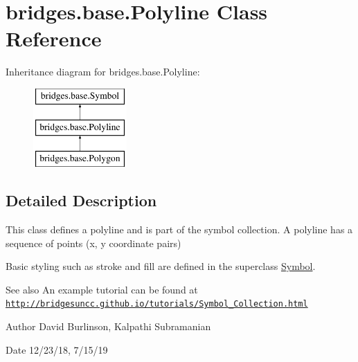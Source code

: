 \hypertarget{classbridges_1_1base_1_1_polyline}{}\section{bridges.\+base.\+Polyline Class Reference}
\label{classbridges_1_1base_1_1_polyline}
Inheritance diagram for bridges.\+base.\+Polyline\+:\begin{figure}[H]
\begin{center}
\leavevmode
\includegraphics[height=3.000000cm]{classbridges_1_1base_1_1_polyline}
\end{center}
\end{figure}


\subsection{Detailed Description}
This class defines a polyline and is part of the symbol collection. A polyline has a sequence of points (x, y coordinate pairs) 

Basic styling such as stroke and fill are defined in the superclass \hyperlink{classbridges_1_1base_1_1_symbol}{Symbol}.

\begin{DoxySeeAlso}{See also}
An example tutorial can be found at \href{http://bridgesuncc.github.io/tutorials/Symbol_Collection.html}{\tt http\+://bridgesuncc.\+github.\+io/tutorials/\+Symbol\+\_\+\+Collection.\+html}
\end{DoxySeeAlso}
\begin{DoxyAuthor}{Author}
David Burlinson, Kalpathi Subramanian 
\end{DoxyAuthor}
\begin{DoxyDate}{Date}
12/23/18, 7/15/19 
\end{DoxyDate}
